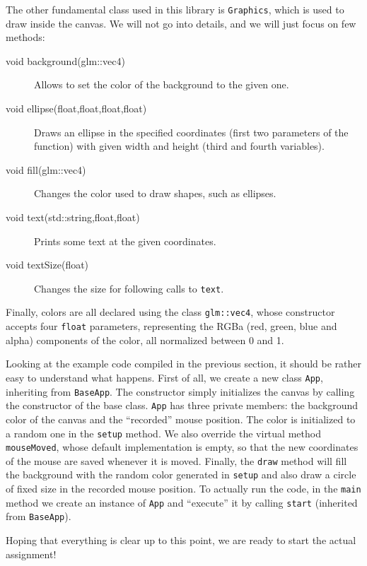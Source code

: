 \documentclass{article}
\begin{document}
The other fundamental class used in this library is \texttt{Graphics}, which is used to draw inside the canvas. We will not go into details, and we will just focus on few methods:

\begin{description}
  \item[void background(glm::vec4)] Allows to set the color of the background to the given one.
  \item[void ellipse(float,float,float,float)] Draws an ellipse in the specified coordinates (first two parameters of the function) with given width and height (third and fourth variables).
  \item[void fill(glm::vec4)] Changes the color used to draw shapes, such as ellipses.
  \item[void text(std::string,float,float)] Prints some text at the given coordinates.
  \item[void textSize(float)] Changes the size for following calls to \texttt{text}.
\end{description}

Finally, colors are all declared using the class \texttt{glm::vec4}, whose constructor accepts four \texttt{float} parameters, representing the RGBa (red, green, blue and alpha) components of the color, all normalized between 0 and 1.

Looking at the example code compiled in the previous section, it should be rather easy to understand what happens. First of all, we create a new class \texttt{App}, inheriting from \texttt{BaseApp}. The constructor simply initializes the canvas by calling the constructor of the base class. \texttt{App} has three private members: the background color of the canvas and the ``recorded'' mouse position. The color is initialized to a random one in the \texttt{setup} method. We also override the virtual method \texttt{mouseMoved}, whose default implementation is empty, so that the new coordinates of the mouse are saved whenever it is moved. Finally, the \texttt{draw} method will fill the background with the random color generated in \texttt{setup} and also draw a circle of fixed size in the recorded mouse position. To actually run the code, in the \texttt{main} method we create an instance of \texttt{App} and ``execute'' it by calling \texttt{start} (inherited from \texttt{BaseApp}).

Hoping that everything is clear up to this point, we are ready to start the actual assignment!
\end{document}
